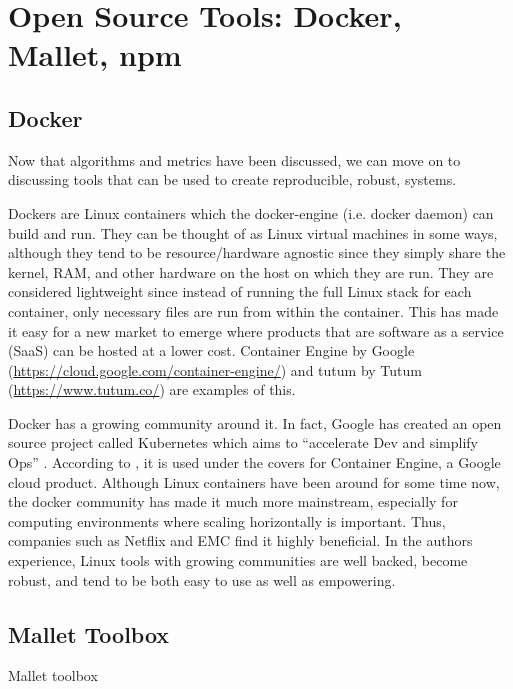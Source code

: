



\section{Open Source Tools: Docker, Mallet, npm}

\subsection{Docker\*}
Now that algorithms and metrics have been discussed, we can move on to discussing tools that can be used to create reproducible, robust, systems.

Dockers are Linux containers which the docker-engine (i.e. docker daemon) can build and run. They can be thought of as Linux virtual machines in some ways, although they tend to be resource/hardware agnostic since they simply share the kernel, RAM, and other hardware on the host on which they are run. They are considered lightweight since instead of running the full Linux stack for each container, only necessary files are run from within the container. This has made it easy for a new market to emerge where products that are software as a service (SaaS) can be hosted at a lower cost. Container Engine by Google (\url{https://cloud.google.com/container-engine/}) and tutum by Tutum (\url{https://www.tutum.co/}) are examples of this.

Docker has a growing community around it. In fact, Google has created an open source project called Kubernetes which aims to ``accelerate Dev and simplify Ops'' \citep{kube_website}. According to \citet{google_container_engine}, it is used under the covers for Container Engine, a Google cloud product. Although Linux containers have been around for some time now, the docker community has made it much more mainstream, especially for computing environments where scaling horizontally is important. Thus, companies such as Netflix and EMC find it highly beneficial. In the authors experience, Linux tools with growing communities are well backed, become robust, and tend to be both easy to use as well as empowering.

\subsection{Mallet Toolbox}
Mallet toolbox

